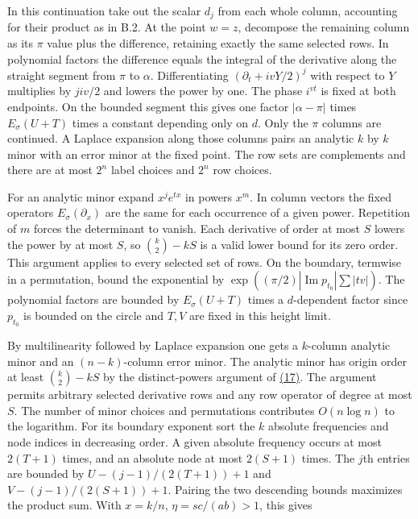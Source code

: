 \documentclass[11pt,a4paper]{article}
\begin{document}
In this continuation take out the scalar \(d_j\) from each whole column, accounting for their product as in B.2. At the point \(w=z\), decompose the remaining column as its \(\pi\) value plus the difference, retaining exactly the same selected rows. In polynomial factors the difference equals the integral of the derivative along the straight segment from \(\pi\) to \(\alpha\). Differentiating \((\partial_t+ivY/2)^j\) with respect to \(Y\) multiplies by \(jiv/2\) and lowers the power by one. The phase \(i^{vt}\) is fixed at both endpoints. On the bounded segment this gives one factor \(|\alpha-\pi|\) times \(E_\sigma(U+T)\) times a constant depending only on \(d\). Only the \(\pi\) columns are continued. A Laplace expansion along those columns pairs an analytic \(k\) by \(k\) minor with an error minor at the fixed point. The row sets are complements and there are at most \(2^n\) label choices and \(2^n\) row choices.

For an analytic minor expand \(x^j e^{tx}\) in powers \(x^m\). In column vectors the fixed operators \(E_\sigma(\partial_x)\) are the same for each occurrence of a given power. Repetition of \(m\) forces the determinant to vanish. Each derivative of order at most \(S\) lowers the power by at most \(S\), so \(\binom k2-kS\) is a valid lower bound for its zero order. This argument applies to every selected set of rows. On the boundary, termwise in a permutation, bound the exponential by \(\exp((\pi/2)|\operatorname{Im}p_{t_0}|\sum|tv|)\). The polynomial factors are bounded by \(E_\sigma(U+T)\) times a \(d\)-dependent factor since \(p_{t_0}\) is bounded on the circle and \(T,V\) are fixed in this height limit.

By multilinearity followed by Laplace expansion one gets a \(k\)-column analytic minor and an \((n-k)\)-column error minor. The analytic minor has origin order at least \(\binom k2-kS\) by the distinct-powers argument of \hyperref[eq:17]{(17)}. The argument permits arbitrary selected derivative rows and any row operator of degree at most \(S\). The number of minor choices and permutations contributes \(O(n\log n)\) to the logarithm. For its boundary exponent sort the \(k\) absolute frequencies and node indices in decreasing order. A given absolute frequency occurs at most \(2(T+1)\) times, and an absolute node at most \(2(S+1)\) times. The \(j\)th entries are bounded by \(U-(j-1)/(2(T+1))+1\) and \(V-(j-1)/(2(S+1))+1\). Pairing the two descending bounds maximizes the product sum. With \(x=k/n\), \(\eta=sc/(ab)>1\), this gives
\end{document}
